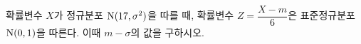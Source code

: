 확률변수 $X$가 정규분포 $\mathrm{N}(17{,}\mkern3mu\mathopen{}\sigma^2)$을 따를 때, 확률변수 $Z=\dfrac{X-m}{6}$은 표준정규분포 $\mathrm{N}(0{,}\mkern3mu\mathopen{}1)$을 따른다. 이때 $m-\sigma$의 값을 구하시오. 
